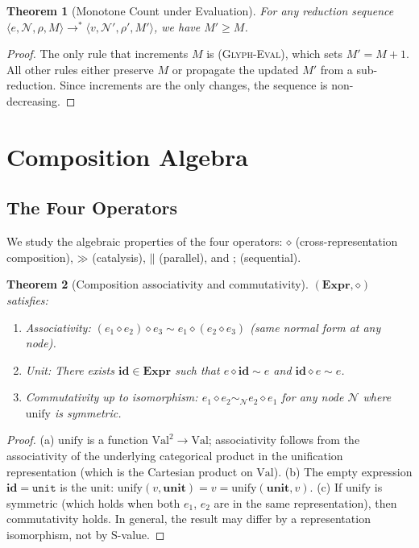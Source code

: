 \documentclass[twocolumn,11pt,a4paper]{article}
\newtheorem{theorem}{Theorem}[section]
\theoremstyle{definition}
\theoremstyle{remark}
\newcommand{\Node}{\mathcal{N}}
\newcommand{\Expr}{\mathbf{Expr}}
\newcommand{\reducesN}{\longrightarrow^{*}}
\newcommand{\catal}{\mathbin{\gg}}
\newcommand{\comp}{\mathbin{\diamond}}
\newcommand{\par}{\mathbin{\parallel}}
\newcommand{\seq}{\mathbin{;}}
\begin{document}
\begin{theorem}[Monotone Count under Evaluation]
\label{thm:monoeval}
For any reduction sequence $\langle e, \Node, \rho, M \rangle
\reducesN \langle v, \Node', \rho', M' \rangle$, we have $M' \geq M$.
\end{theorem}
\begin{proof}
The only rule that increments $M$ is \textsc{(Glyph-Eval)}, which
sets $M' = M+1$.  All other rules either preserve $M$ or propagate
the updated $M'$ from a sub-reduction.  Since increments are the
only changes, the sequence is non-decreasing.
\end{proof}

\section{Composition Algebra}
\label{sec:algebra}

\subsection{The Four Operators}

We study the algebraic properties of the four operators:
$\comp$ (cross-representation composition), $\catal$
(catalysis), $\par$ (parallel), and $\seq$ (sequential).

\begin{theorem}[Composition associativity and commutativity]
\label{thm:compAlg}
$(\Expr, \comp)$ satisfies:
\begin{enumerate}[label=(\alph*),noitemsep,topsep=2pt]
\item \emph{Associativity}: $(e_1 \comp e_2) \comp e_3 \sim
  e_1 \comp (e_2 \comp e_3)$ (same normal form at any node).
\item \emph{Unit}: There exists $\mathbf{id} \in \Expr$ such that
  $e \comp \mathbf{id} \sim e$ and $\mathbf{id} \comp e \sim e$.
\item \emph{Commutativity up to isomorphism}: $e_1 \comp e_2 \sim_\Node
  e_2 \comp e_1$ for any node $\Node$ where $\mathrm{unify}$ is
  symmetric.
\end{enumerate}
\end{theorem}
\begin{proof}
(a) $\mathrm{unify}$ is a function $\mathrm{Val}^2 \to \mathrm{Val}$;
associativity follows from the associativity of the underlying
categorical product in the unification representation (which is the
Cartesian product on $\mathrm{Val}$).
(b) The empty expression $\mathbf{id} = \texttt{unit}$ is the unit:
$\mathrm{unify}(v, \mathbf{unit}) = v = \mathrm{unify}(\mathbf{unit}, v)$.
(c) If $\mathrm{unify}$ is symmetric (which holds when both $e_1$, $e_2$
are in the same representation), then commutativity holds.  In general,
the result may differ by a representation isomorphism, not by S-value.
\end{proof}
\end{document}
